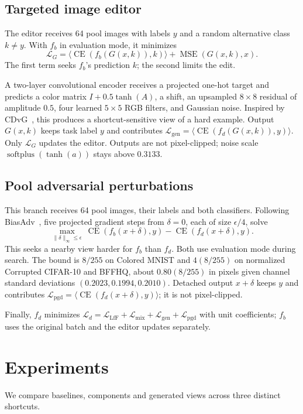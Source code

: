 \documentclass[10pt,twocolumn,letterpaper]{article}
\newcommand{\CE}{\operatorname{CE}}
\begin{document}
\subsection{Targeted image editor}
The editor receives 64 pool images with labels $y$ and a random alternative class $k\ne y$. With $f_b$ in evaluation mode, it minimizes
\begin{equation}
 \mathcal L_G=\langle\CE(f_b(G(x,k)),k)\rangle+\operatorname{MSE}(G(x,k),x).
\end{equation}
The first term seeks $f_b$'s prediction $k$; the second limits the edit.


A two-layer convolutional encoder receives a projected one-hot target and predicts a color matrix $I+0.5\tanh(A)$, a shift, an upsampled $8\times8$ residual of amplitude $0.5$, four learned $5\times5$ RGB filters, and Gaussian noise. Inspired by CDvG~\cite{jung2023cdvg}, this produces a shortcut-sensitive view of a hard example. Output $G(x,k)$ keeps task label $y$ and contributes $\mathcal L_{\mathrm{gen}}=\langle\CE(f_d(G(x,k)),y)\rangle$. Only $\mathcal L_G$ updates the editor. Outputs are not pixel-clipped; noise scale $\operatorname{softplus}(\tanh(a))$ stays above $0.3133$.

\subsection{Pool adversarial perturbations}
This branch receives 64 pool images, their labels and both classifiers. Following BiasAdv~\cite{lim2023biasadv}, five projected gradient steps from $\delta=0$, each of size $\epsilon/4$, solve
\begin{equation}
 \max_{\|\delta\|_\infty\le\epsilon}\ \CE(f_b(x+\delta),y)-\CE(f_d(x+\delta),y).
\end{equation}
This seeks a nearby view harder for $f_b$ than $f_d$. Both use evaluation mode during search. The bound is $8/255$ on Colored MNIST and $4(8/255)$ on normalized Corrupted CIFAR-10 and BFFHQ, about $0.80(8/255)$ in pixels given channel standard deviations $(0.2023,0.1994,0.2010)$. Detached output $x+\delta$ keeps $y$ and contributes $\mathcal L_{\mathrm{pgd}}=\langle\CE(f_d(x+\delta),y)\rangle$; it is not pixel-clipped.

Finally, $f_d$ minimizes $\mathcal L_d=\mathcal L_{\mathrm{LfF}}+\mathcal L_{\mathrm{mix}}+\mathcal L_{\mathrm{gen}}+\mathcal L_{\mathrm{pgd}}$ with unit coefficients; $f_b$ uses the original batch and the editor updates separately.

\section{Experiments}
We compare baselines, components and generated views across three distinct shortcuts.
\end{document}
